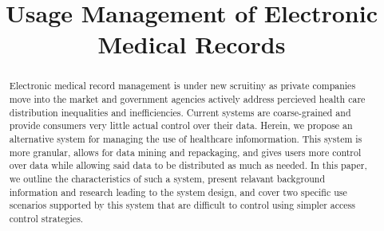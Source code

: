 \documentclass[10pt, conference, compsocconf]{IEEEtran}
\begin{document}
%
\title{Usage Management of Electronic Medical Records}


\author{
}


% 

\maketitle


\begin{abstract}
Electronic medical record management is under new scruitiny as private companies move into the market and government agencies actively address percieved health care distribution inequalities and inefficiencies.  Current systems are coarse-grained and provide consumers very little actual control over their data.  Herein, we propose an alternative system for managing the use of healthcare infomormation.  This system is more granular, allows for data mining and repackaging, and gives users more control over data while allowing said data to be distributed as much as needed.  In this paper, we outline the characteristics of such a system, present relavant background information and research leading to the system design, and cover two specific use scenarios supported by this system that are difficult to control using simpler access control strategies.
\end{abstract}
\end{document}
